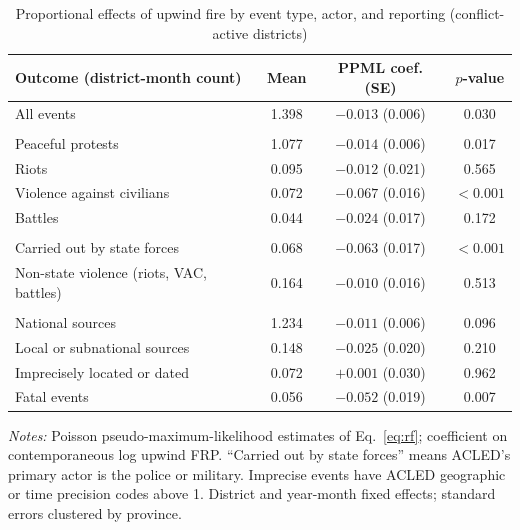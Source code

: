 \documentclass[12pt]{article}
\begin{document}
\begin{table}[!htbp]
\centering
\caption{Proportional effects of upwind fire by event type, actor, and reporting (conflict-active districts)}
\label{tab:mechanisms}
\small
\begin{tabular}{lccc}
\toprule
Outcome (district-month count) & Mean & PPML coef. (SE) & $p$-value \\
\midrule
All events & 1.398 & $-0.013$ (0.006) & 0.030 \\
\addlinespace
\multicolumn{4}{l}{\emph{Event type}} \\
\quad Peaceful protests & 1.077 & $-0.014$ (0.006) & 0.017 \\
\quad Riots & 0.095 & $-0.012$ (0.021) & 0.565 \\
\quad Violence against civilians & 0.072 & $-0.067$ (0.016) & $<0.001$ \\
\quad Battles & 0.044 & $-0.024$ (0.017) & 0.172 \\
\addlinespace
\multicolumn{4}{l}{\emph{Actor}} \\
\quad Carried out by state forces & 0.068 & $-0.063$ (0.017) & $<0.001$ \\
\quad Non-state violence (riots, VAC, battles) & 0.164 & $-0.010$ (0.016) & 0.513 \\
\addlinespace
\multicolumn{4}{l}{\emph{Reporting}} \\
\quad National sources & 1.234 & $-0.011$ (0.006) & 0.096 \\
\quad Local or subnational sources & 0.148 & $-0.025$ (0.020) & 0.210 \\
\quad Imprecisely located or dated & 0.072 & $+0.001$ (0.030) & 0.962 \\
\quad Fatal events & 0.056 & $-0.052$ (0.019) & 0.007 \\
\bottomrule
\end{tabular}
\begin{minipage}{0.95\textwidth}
\vspace{4pt}
\footnotesize \emph{Notes:} Poisson pseudo-maximum-likelihood estimates of Eq.~\eqref{eq:rf}; coefficient on contemporaneous log upwind FRP. ``Carried out by state forces'' means ACLED's primary actor is the police or military. Imprecise events have ACLED geographic or time precision codes above 1. District and year-month fixed effects; standard errors clustered by province.
\end{minipage}
\end{table}
\end{document}
